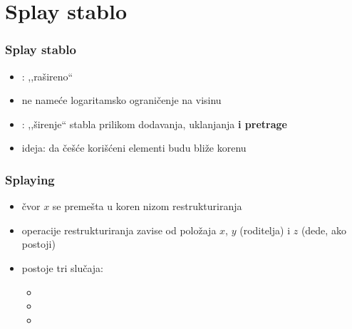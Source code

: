 \documentclass[compress]{beamer}
\begin{document}
\section[Splay stablo]{Splay stablo}
\begin{frame}[fragile]
  \frametitle{Splay stablo}
  \begin{itemize}
    \item {}: ,,rašireno`` 
    \item ne nameće logaritamsko ograničenje na visinu
    \item {}: ,,širenje`` stabla prilikom dodavanja, uklanjanja \textbf{i pretrage}
    \item ideja: da češće korišćeni elementi budu bliže korenu
  \end{itemize}
\end{frame}

\begin{frame}[fragile]
  \frametitle{Splaying}
  \begin{itemize}
    \item čvor $x$ se premešta u koren nizom restrukturiranja 
    \item operacije restrukturiranja zavise od položaja $x$, $y$ (roditelja) i $z$ (dede, ako postoji)
    \item postoje tri slučaja:
    \begin{itemize}
      \item {}
      \item {}
      \item {}
    \end{itemize}
  \end{itemize}
\end{frame}
\end{document}
